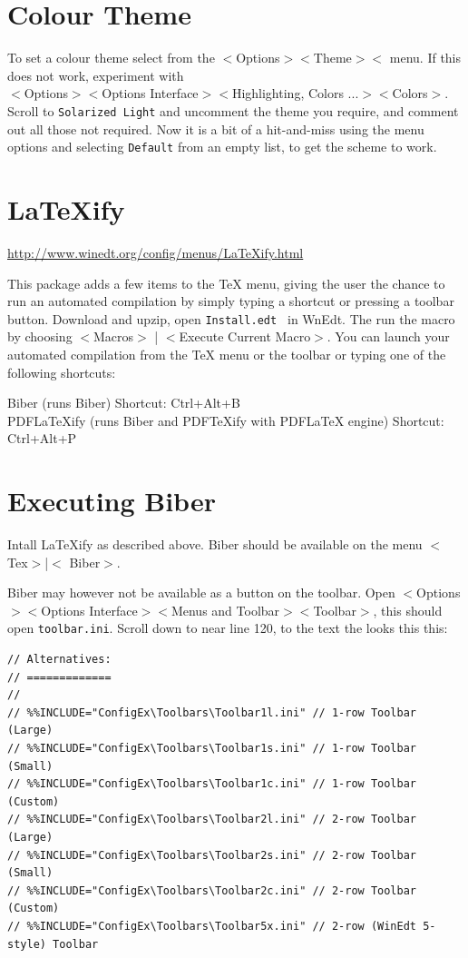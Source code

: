 \section{Colour Theme}

To set a colour theme select from the
$<$Options$>$$<$Theme$>$$<$ menu.  If this does not work, experiment with \\
$<$Options$>$$<$Options Interface$>$$<$Highlighting, Colors ...$>$$<$Colors$>$. Scroll to \lstinline{Solarized Light} and uncomment the theme you require, and comment out all those not required.  Now it is a bit of a hit-and-miss using the menu options and selecting \lstinline{Default} from an empty list, to get the scheme to work.


\section{LaTeXify}

\url{http://www.winedt.org/config/menus/LaTeXify.html}

This package adds a few items to the TeX menu, giving the user the chance to run an automated compilation by simply typing a shortcut or pressing a toolbar button.  Download and upzip, open \lstinline{Install.edt } in WnEdt. The run the macro  by choosing $<$Macros$>$ | $<$Execute Current Macro$>$.  You can launch your automated compilation from the TeX menu or the toolbar or typing one of the following shortcuts:

Biber (runs Biber) Shortcut: Ctrl+Alt+B\\
PDFLaTeXify (runs Biber and PDFTeXify with PDFLaTeX engine) Shortcut: Ctrl+Alt+P

\section{Executing Biber}

Intall LaTeXify as described above. Biber should be available on the menu $<$ Tex$>$|$<$ Biber$>$.

Biber may however not be available as a button on the toolbar. Open
$<$Options$>$$<$Options Interface$>$$<$Menus and Toolbar$>$$<$Toolbar$>$, this should open \lstinline{toolbar.ini}.
Scroll down to near line 120, to the text the looks this this:

\begin{lstlisting}
// Alternatives:
// =============
//
// %%INCLUDE="ConfigEx\Toolbars\Toolbar1l.ini" // 1-row Toolbar (Large)
// %%INCLUDE="ConfigEx\Toolbars\Toolbar1s.ini" // 1-row Toolbar (Small)
// %%INCLUDE="ConfigEx\Toolbars\Toolbar1c.ini" // 1-row Toolbar (Custom)
// %%INCLUDE="ConfigEx\Toolbars\Toolbar2l.ini" // 2-row Toolbar (Large)
// %%INCLUDE="ConfigEx\Toolbars\Toolbar2s.ini" // 2-row Toolbar (Small)
// %%INCLUDE="ConfigEx\Toolbars\Toolbar2c.ini" // 2-row Toolbar (Custom)
// %%INCLUDE="ConfigEx\Toolbars\Toolbar5x.ini" // 2-row (WinEdt 5-style) Toolbar
\end{lstlisting}

